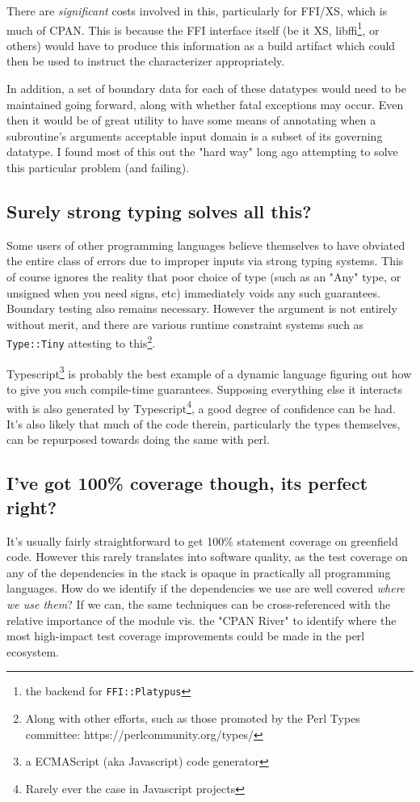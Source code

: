 \documentclass{article}
\begin{document}
There are \textit{significant} costs involved in this, particularly for FFI/XS, which is much of CPAN.
This is because the FFI interface itself (be it XS, libffi\footnote{the backend for \texttt{FFI::Platypus}}, or others) would have to produce this information as a build artifact
which could then be used to instruct the characterizer appropriately.

In addition, a set of boundary data for each of these datatypes would need to be maintained going forward, along with whether fatal exceptions may occur.
Even then it would be of great utility to have some means of annotating when a subroutine's arguments acceptable input domain is a subset of its governing datatype.
I found most of this out the "hard way" \cite{gsb} long ago attempting to solve this particular problem (and failing).

\subsection{Surely strong typing solves all this?}

Some users of other programming languages believe themselves to have obviated the entire class of errors due to improper inputs via strong typing systems.
This of course ignores the reality that poor choice of type (such as an "Any" type, or unsigned when you need signs, etc) immediately voids any such guarantees.
Boundary testing also remains necessary.
However the argument is not entirely without merit, and there are various runtime constraint systems such as \texttt{Type::Tiny} attesting to this\footnote{Along with other efforts, such as those promoted by the Perl Types committee: https://perlcommunity.org/types/}.

Typescript\footnote{a ECMAScript (aka Javascript) code generator} is probably the best example of a dynamic language figuring out how to give you such compile-time guarantees.
Supposing everything else it interacts with is also generated by Typescript\footnote{Rarely ever the case in Javascript projects}, a good degree of confidence can be had.
It's also likely that much of the code therein, particularly the types themselves, can be repurposed towards doing the same with perl.

\subsection{I've got 100\% coverage though, its perfect right?}

It's usually fairly straightforward to get 100\% statement coverage on greenfield code.
However this rarely translates into software quality, as the test coverage on any of the dependencies in the stack is opaque in practically all programming languages.
How do we identify if the dependencies we use are well covered \textit{where we use them}?
If we can, the same techniques can be cross-referenced with the relative importance of the module vis. the "CPAN River" to identify where the most high-impact test coverage improvements could be made in the perl ecosystem.
\end{document}
